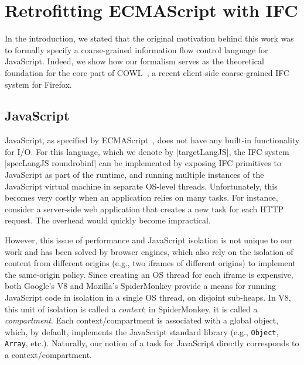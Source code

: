 \section{Retrofitting ECMAScript with IFC}
\label{sec:real}

In the introduction, we stated that the original motivation behind
this work was to formally specify a
coarse-grained information flow control language for JavaScript.
%
Indeed, we show how our formalism serves as the theoretical foundation for the
core part of COWL~\cite{swapi}, a recent client-side coarse-grained IFC system
for Firefox.



%


\subsection{JavaScript}
\label{sec:real:js}

JavaScript, as specified by
ECMAScript~\cite{ecma}, does not have any built-in
functionality for I/O.
%
For this language, which we denote by |targetLangJS|, the IFC system
|specLangJS roundrobinf| can be implemented by exposing IFC primitives
to JavaScript as part of the runtime, and running multiple instances
of the JavaScript virtual machine in separate OS-level threads.
%
Unfortunately, this becomes very costly when an application relies on
many tasks.
%
For instance, consider a server-side web application that
creates a new task for each HTTP request.  The overhead would
quickly become impractical.

However, this issue of performance and JavaScript isolation is not
unique to our work and has been solved by browser engines,
which also
rely on the isolation of content from
different origins (e.g., two iframes of different origins) to
implement the same-origin policy.
%
Since creating an OS thread for each iframe is expensive, both
Google's V8 and Mozilla's SpiderMonkey provide a means for running
JavaScript code in isolation in a single OS thread,
on disjoint sub-heaps.
%
In V8, this unit of isolation is called a \emph{context}; in
SpiderMonkey, it is called a \emph{compartment}.
%
Each context/compartment is associated with a global object, which, by
default, implements the JavaScript standard library (e.g.,
\verb|Object|, \verb|Array|, etc.).
%
Naturally, our notion of a task for JavaScript directly corresponds to
a context/compartment.


